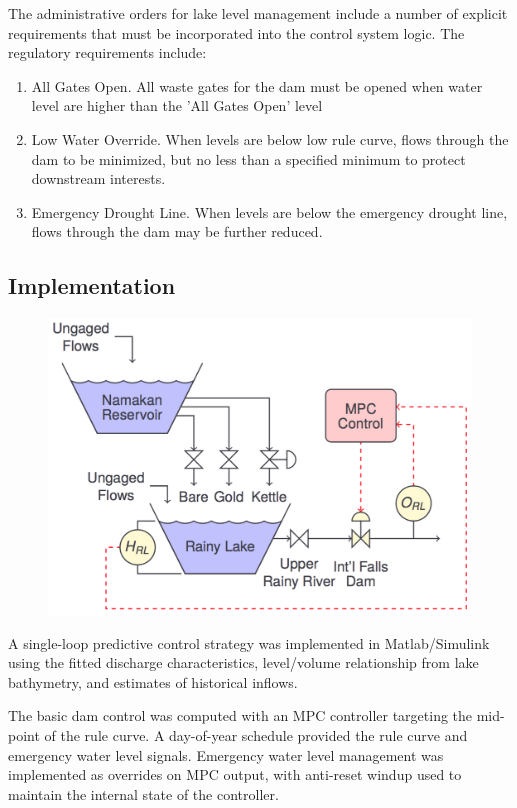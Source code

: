 \documentclass[preprint,times]{elsarticle}
\begin{document}
The administrative orders for lake level management include a number of explicit requirements that must be incorporated into the control system logic.  The regulatory requirements include:

\begin{enumerate}
    \item All Gates Open. All waste gates for the dam must be opened when water level are higher than the 'All Gates Open' level
    \item Low Water Override. When levels are below low rule curve, flows through the dam to be minimized, but no less than a specified minimum to protect downstream interests.
    \item Emergency Drought Line.  When levels are below the emergency drought line, flows through the dam may be further reduced.
\end{enumerate}

\subsection{Implementation}

\begin{figure}
\includegraphics[width=\linewidth]{RLMPC}
\caption{}\label{figure:9}
\end{figure}

A single-loop predictive control strategy was implemented in Matlab/Simulink using the fitted discharge characteristics, level/volume relationship from lake bathymetry, and estimates of historical inflows. 

The basic dam control was computed with an MPC controller targeting the mid-point of the rule curve. A day-of-year schedule provided the rule curve and emergency water level signals. Emergency water level management was implemented as overrides on MPC output, with anti-reset windup used to maintain the internal state of the controller.
\end{document}

